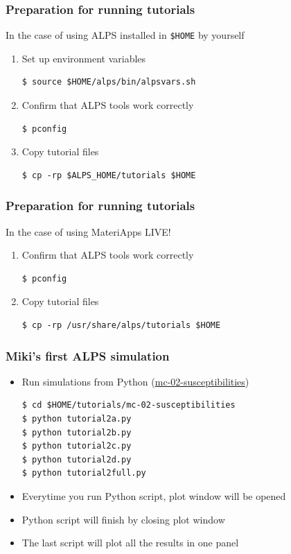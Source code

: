 \begin{frame}[t,fragile]
  \frametitle{Preparation for running tutorials}
  In the case of using ALPS installed in \verb+$HOME+ by yourself
  \begin{enumerate}
  \item Set up environment variables
\begin{lstlisting}
$ source $HOME/alps/bin/alpsvars.sh
\end{lstlisting}
  \item Confirm that ALPS tools work correctly
\begin{lstlisting}
$ pconfig
\end{lstlisting}
  \item Copy tutorial files
\begin{lstlisting}
$ cp -rp $ALPS_HOME/tutorials $HOME
\end{lstlisting}
  \end{enumerate}
\end{frame}

\begin{frame}[t,fragile]
  \frametitle{Preparation for running tutorials}
  In the case of using MateriApps LIVE!
  \begin{enumerate}
  \item Confirm that ALPS tools work correctly
\begin{lstlisting}
$ pconfig
\end{lstlisting}
  \item Copy tutorial files
\begin{lstlisting}
$ cp -rp /usr/share/alps/tutorials $HOME
\end{lstlisting}
  \end{enumerate}
\end{frame}

\begin{frame}[t,fragile]
  \frametitle{Miki's first ALPS simulation}
  \begin{itemize}
    \item Run simulations from Python (\href{http://alps.comp-phys.org/mediawiki/index.php/ALPS_2_Tutorials:MC-02_Susceptibilities}{mc-02-susceptibilities})
\begin{lstlisting}
$ cd $HOME/tutorials/mc-02-susceptibilities
$ python tutorial2a.py
$ python tutorial2b.py
$ python tutorial2c.py
$ python tutorial2d.py
$ python tutorial2full.py
\end{lstlisting}
    \item Everytime you run Python script, plot window will be opened
    \item Python script will finish by closing plot window
    \item The last script will plot all the results in one panel
  \end{itemize}
\end{frame}

